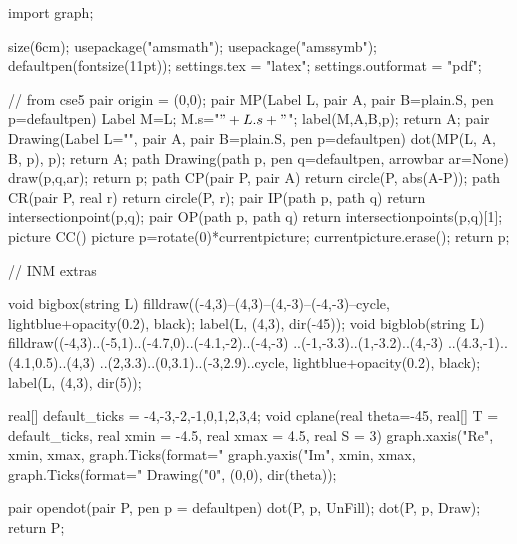 \usepackage{patch-asy}
\renewcommand{\theasy}{\thechapter\Alph{asy}}
\begin{asydef}
	import graph;

	size(6cm);
	usepackage("amsmath");
	usepackage("amssymb");
	defaultpen(fontsize(11pt));
	settings.tex = "latex";
	settings.outformat = "pdf";

	// from cse5
	pair origin = (0,0);
	pair MP(Label L, pair A, pair B=plain.S, pen p=defaultpen) {
		Label M=L;
		M.s="\("+L.s+"\)";
		label(M,A,B,p);
		return A;
	}
	pair Drawing(Label L="", pair A, pair B=plain.S, pen p=defaultpen) {
		dot(MP(L, A, B, p), p);
		return A;
	}
	path Drawing(path p, pen q=defaultpen, arrowbar ar=None) {
		draw(p,q,ar);
		return p;
	}
	path CP(pair P, pair A) { return circle(P, abs(A-P)); }
	path CR(pair P, real r) { return circle(P, r); }
	pair IP(path p, path q) { return intersectionpoint(p,q); }
	pair OP(path p, path q) { return intersectionpoints(p,q)[1]; }
	picture CC() {
		picture p=rotate(0)*currentpicture;
		currentpicture.erase();
		return p;
	}

	// INM extras

	void bigbox(string L) {
		filldraw((-4,3)--(4,3)--(4,-3)--(-4,-3)--cycle,
			lightblue+opacity(0.2), black);
		label(L, (4,3), dir(-45));
	}
	void bigblob(string L) {
		filldraw((-4,3)..(-5,1)..(-4.7,0)..(-4.1,-2)..(-4,-3)
			..(-1,-3.3)..(1,-3.2)..(4,-3)
			..(4.3,-1)..(4.1,0.5)..(4,3)
			..(2,3.3)..(0,3.1)..(-3,2.9)..cycle,
			lightblue+opacity(0.2), black);
		label(L, (4,3), dir(5));
	}

	real[] default_ticks = {-4,-3,-2,-1,0,1,2,3,4};
	void cplane(real theta=-45, real[] T = default_ticks, real xmin = -4.5, real xmax = 4.5, real S = 3) {
		graph.xaxis("Re", xmin, xmax, graph.Ticks(format="%
		graph.yaxis("Im", xmin, xmax, graph.Ticks(format="%
		Drawing("0", (0,0), dir(theta));
	}

	pair opendot(pair P, pen p = defaultpen) {
		dot(P, p, UnFill);
		dot(P, p, Draw);
		return P;
	}
\end{asydef}
\def\asydir{asy}

